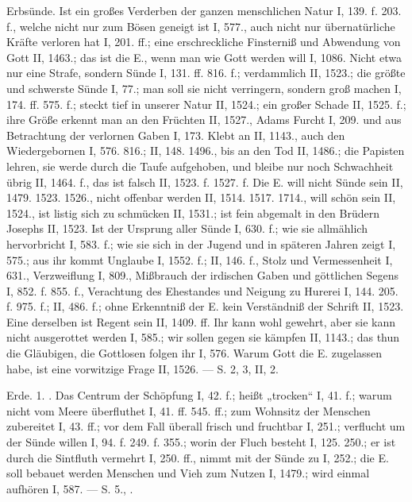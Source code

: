 Erbsünde. Ist ein großes Verderben der ganzen menschlichen Natur I, 139. f. 203. f., welche nicht nur zum Bösen geneigt ist I, 577., auch nicht nur übernatürliche Kräfte verloren hat I, 201. ff.; eine erschreckliche Finsterniß und Abwendung von Gott II, 1463.; das ist die E., wenn man wie Gott werden will I, 1086. Nicht etwa nur eine Strafe, sondern Sünde I, 131. ff. 816. f.; verdammlich II, 1523.; die größte und schwerste Sünde I, 77.; man soll sie nicht verringern, sondern groß machen I, 174. ff. 575. f.; steckt tief in unserer Natur II, 1524.; ein großer Schade II, 1525. f.; ihre Größe erkennt man an den Früchten II, 1527., Adams Furcht I, 209. und aus Betrachtung der verlornen Gaben I, 173. Klebt  an II, 1143., auch den Wiedergebornen I, 576. 816.; II, 148. 1496., bis an den Tod II, 1486.; die Papisten lehren, sie werde durch die Taufe aufgehoben, und bleibe nur noch Schwachheit übrig II, 1464. f., das ist falsch II, 1523. f. 1527. f. Die E. will nicht Sünde sein II, 1479. 1523. 1526., nicht offenbar werden II, 1514. 1517. 1714., will schön sein II, 1524., ist listig sich zu schmücken II, 1531.; ist fein abgemalt in den Brüdern Josephs II, 1523. Ist der Ursprung aller Sünde I, 630. f.; wie sie allmählich hervorbricht I, 583. f.; wie sie sich in der Jugend und in späteren Jahren zeigt I, 575.; aus ihr kommt Unglaube I, 1552. f.; II, 146. f., Stolz und Vermessenheit I, 631., Verzweiflung I, 809., Mißbrauch der irdischen Gaben und göttlichen Segens I, 852. f. 855. f., Verachtung des Ehestandes und Neigung zu Hurerei I, 144. 205. f. 975. f.; II, 486. f.; ohne Erkenntniß der E. kein Verständniß der Schrift II, 1523. Eine  derselben ist Regent sein II, 1409. ff. Ihr kann wohl gewehrt, aber sie kann nicht ausgerottet werden I, 585.; wir sollen gegen sie kämpfen II, 1143.; das thun die Gläubigen, die Gottlosen folgen ihr I, 576. Warum Gott die E. zugelassen habe, ist eine vorwitzige Frage II, 1526. — S.  2, 3,  II, 2.

Erde. 1. . Das Centrum der Schöpfung I, 42. f.; heißt „trocken“ I, 41. f.; warum nicht vom Meere überfluthet I, 41. ff. 545. ff.; zum Wohnsitz der Menschen zubereitet I, 43. ff.; vor dem Fall überall frisch und fruchtbar I, 251.; verflucht um der Sünde willen I, 94. f. 249. f. 355.; worin der Fluch besteht I, 125. 250.; er ist durch die Sintfluth vermehrt I, 250. ff., nimmt mit der Sünde zu I, 252.; die E. soll bebauet werden Menschen und Vieh zum Nutzen I, 1479.; wird einmal aufhören I, 587. — S.  5., .

